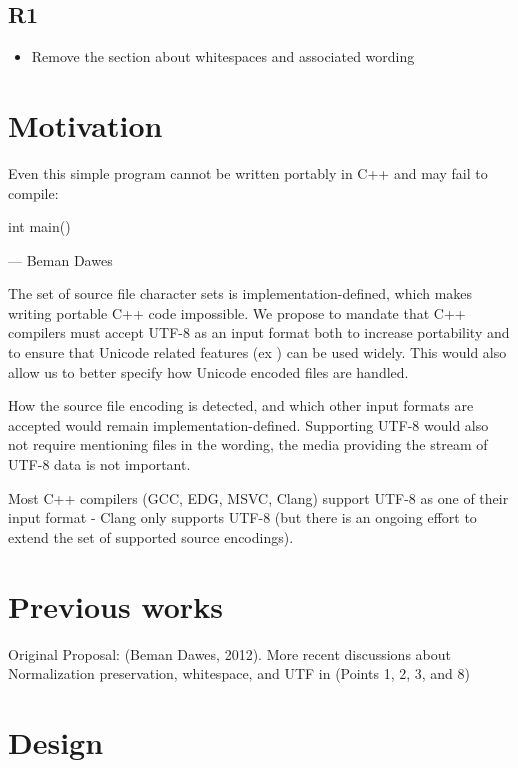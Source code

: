 \documentclass{wg21}
\begin{document}
\subsection{R1}
\begin{itemize}
    \item Remove the section about whitespaces and associated wording
\end{itemize}

\section{Motivation}

\begin{quoteblock}
    Even this simple program cannot be written portably in C++ and may fail to compile:
\begin{codeblock}
    int main() {}
\end{codeblock}
 --- Beman Dawes
\end{quoteblock}

The set of source file character sets is implementation-defined, which makes writing portable C++ code impossible.
We propose to mandate that C++ compilers must accept UTF-8 as an input format both to increase portability and
to ensure that Unicode related features (ex ) can be used widely.
This would also allow us to better specify how Unicode encoded files are handled.

How the source file encoding is detected, and which other input formats are accepted would remain implementation-defined.
Supporting UTF-8 would also not require mentioning files in the wording, the media providing the stream of UTF-8 data is not important.

Most C++ compilers (GCC, EDG, MSVC, Clang) support UTF-8 as one of their input format - Clang only supports UTF-8 (but there is an ongoing effort to extend the set of supported
source encodings).

\section{Previous works}

Original Proposal:  (Beman Dawes, 2012).
More recent discussions about Normalization preservation, whitespace, and UTF in  (Points 1, 2, 3, and 8)

\section{Design}
\end{document}
